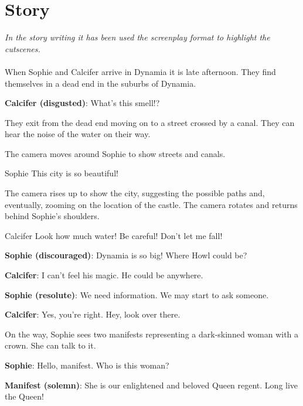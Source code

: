 \section{Story}

\textit{In the story writing it has been used the screenplay format to highlight the cutscenes.}\\\\

When Sophie and Calcifer arrive in Dynamia it is late afternoon. They find themselves in a dead end in the suburbs of Dynamia.

\textbf{Calcifer (disgusted)}: What’s this smell!?

They exit from the dead end moving on to a street crossed by a canal. They can hear the noise of the water on their way.

\begin{screenplay}

The camera  moves around Sophie to show streets and canals. 

\begin{dialogue}[amazed]{Sophie}
This city is so beautiful!
\end{dialogue}

The camera rises up to show the city, suggesting the possible paths and, eventually,  zooming on the location of the castle. The camera rotates and returns behind Sophie's shoulders. 

\begin{dialogue}[worried]{Calcifer}
Look how much water! Be careful! Don’t let me fall!
\end{dialogue}
\end{screenplay}
\vspace{1em}

\textbf{Sophie (discouraged)}: Dynamia is so big! Where Howl could be?

\textbf{Calcifer}: I can’t feel his magic. He could be anywhere.

\textbf{Sophie (resolute)}: We need information. We may start to ask someone.

\textbf{Calcifer}: Yes, you're right. Hey, look over there.

On the way, Sophie sees two manifests representing a dark-skinned woman with a crown. She can talk to it.

\textbf{Sophie}: Hello, manifest. Who is this woman?

\textbf{Manifest (solemn)}: She is our enlightened and beloved Queen regent. Long live the Queen!

